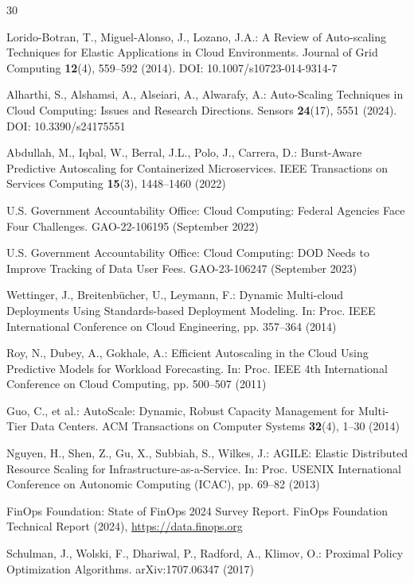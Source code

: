 \documentclass[runningheads]{llncs}
\begin{document}
\begin{thebibliography}{30}

 Lorido-Botran, T., Miguel-Alonso, J., Lozano, J.A.: A Review of Auto-scaling Techniques for Elastic Applications in Cloud Environments. Journal of Grid Computing \textbf{12}(4), 559--592 (2014). DOI: 10.1007/s10723-014-9314-7

 Alharthi, S., Alshamsi, A., Alseiari, A., Alwarafy, A.: Auto-Scaling Techniques in Cloud Computing: Issues and Research Directions. Sensors \textbf{24}(17), 5551 (2024). DOI: 10.3390/s24175551

 Abdullah, M., Iqbal, W., Berral, J.L., Polo, J., Carrera, D.: Burst-Aware Predictive Autoscaling for Containerized Microservices. IEEE Transactions on Services Computing \textbf{15}(3), 1448--1460 (2022)

 U.S. Government Accountability Office: Cloud Computing: Federal Agencies Face Four Challenges. GAO-22-106195 (September 2022)

 U.S. Government Accountability Office: Cloud Computing: DOD Needs to Improve Tracking of Data User Fees. GAO-23-106247 (September 2023)

 Wettinger, J., Breitenb\"{u}cher, U., Leymann, F.: Dynamic Multi-cloud Deployments Using Standards-based Deployment Modeling. In: Proc. IEEE International Conference on Cloud Engineering, pp. 357--364 (2014)

 Roy, N., Dubey, A., Gokhale, A.: Efficient Autoscaling in the Cloud Using Predictive Models for Workload Forecasting. In: Proc. IEEE 4th International Conference on Cloud Computing, pp. 500--507 (2011)

 Guo, C., et al.: AutoScale: Dynamic, Robust Capacity Management for Multi-Tier Data Centers. ACM Transactions on Computer Systems \textbf{32}(4), 1--30 (2014)

 Nguyen, H., Shen, Z., Gu, X., Subbiah, S., Wilkes, J.: AGILE: Elastic Distributed Resource Scaling for Infrastructure-as-a-Service. In: Proc. USENIX International Conference on Autonomic Computing (ICAC), pp. 69--82 (2013)

 FinOps Foundation: State of FinOps 2024 Survey Report. FinOps Foundation Technical Report (2024), \url{https://data.finops.org}

 Schulman, J., Wolski, F., Dhariwal, P., Radford, A., Klimov, O.: Proximal Policy Optimization Algorithms. arXiv:1707.06347 (2017)


\end{thebibliography}
\end{document}

